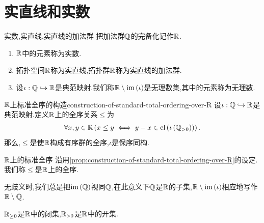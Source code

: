 \section{实直线和实数}

\begin{definition}{实数,实直线,实直线的加法群}{}
	把加法群$\mathbb{Q}$的完备化记作$\mathbb{R}$.
	\begin{enumerate}
		\item $\mathbb{R}$中的元素称为实数.
		\item 拓扑空间$\mathbb{R}$称为实直线,拓扑群$\mathbb{R}$称为实直线的加法群.
		\item 设$\iota:\mathbb{Q}\hookrightarrow\mathbb{R}$是典范映射.我们称$\mathbb{R}\setminus\operatorname{im}\left(\iota\right)$是无理数集,其中的元素称为无理数.
	\end{enumerate}
\end{definition}

\begin{proposition}{$\mathbb{R}$上标准全序的构造}{construction-of-standard-total-ordering-over-R}
	设$\iota:\mathbb{Q}\hookrightarrow\mathbb{R}$是典范映射.定义$\mathbb{R}$上的全序关系$\leq$为
	\begin{align*}
		\forall x,y\in\mathbb{R}\left(x\leq y\iff y-x\in\operatorname{cl}\left(\iota\left(\mathbb{Q}_{>0}\right)\right)\right).
	\end{align*}
	那么,$\leq$是使$\mathbb{R}$构成有序群的全序,$\iota$是保序同构.
\end{proposition}

\begin{definition}{$\mathbb{R}$上的标准全序}{}
	沿用\cref{prop:construction-of-standard-total-ordering-over-R}的设定.我们称$\leq$是$\mathbb{R}$上的全序.
\end{definition}

\begin{convention}{}{}
	无歧义时,我们总是把$\operatorname{im}\left(\mathbb{Q}\right)$视同$\mathbb{Q}$,在此意义下$\mathbb{Q}$是$\mathbb{R}$的子集,$\mathbb{R}\setminus\operatorname{im}\left(\iota\right)$相应地写作$\mathbb{R}\setminus\mathbb{Q}$.
\end{convention}

\begin{proposition}{}{}
	$\mathbb{R}_{\geq 0}$是$\mathbb{R}$中的闭集,$\mathbb{R}_{>0}$是$\mathbb{R}$中的开集.
\end{proposition}